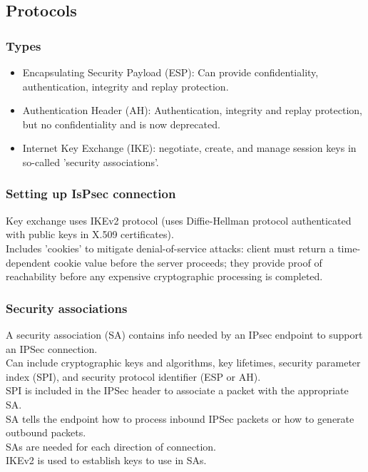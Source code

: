 \documentclass{article}
\begin{document}
\subsection{Protocols}

\subsubsection{Types}

\begin{itemize}
    \item Encapsulating Security Payload (ESP): Can provide confidentiality, authentication, integrity and replay protection.
    \item Authentication Header (AH): Authentication, integrity and replay protection, but no confidentiality and is now deprecated.
    \item Internet Key Exchange (IKE): negotiate, create, and manage session keys in so-called 'security associations'.
\end{itemize}

\subsubsection{Setting up IsPsec connection}

Key exchange uses IKEv2 protocol (uses Diffie-Hellman protocol authenticated with public keys in X.509 certificates).\\
Includes 'cookies' to mitigate denial-of-service attacks: client must return a time-dependent cookie value before the server proceeds; they provide proof of reachability before any expensive cryptographic processing is completed.

\subsubsection{Security associations}

A security association (SA) contains info needed by an IPsec endpoint to support an IPSec connection.\\
Can include cryptographic keys and algorithms, key lifetimes, security parameter index (SPI), and security protocol identifier (ESP or AH).\\
SPI is included in the IPSec header to associate a packet with the appropriate SA.\\
SA tells the endpoint how to process inbound IPSec packets or how to generate outbound packets.\\
SAs are needed for each direction of connection.\\
IKEv2 is used to establish keys to use in SAs.
\end{document}
